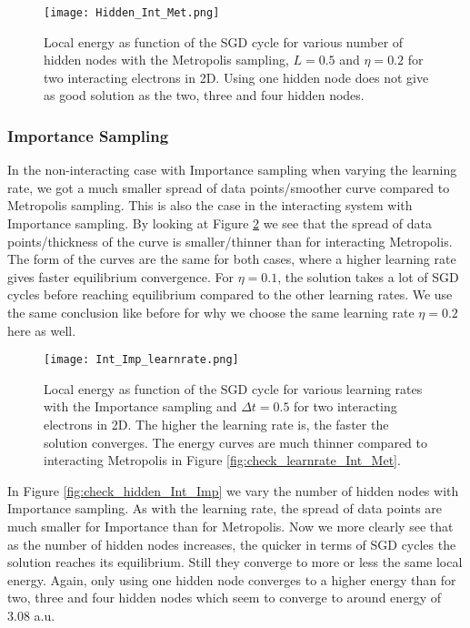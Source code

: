 \documentclass[12pt,a4paper,english]{article}
\begin{document}
\begin{figure}[t!]
	\centering\texttt{[image: Hidden\_Int\_Met.png]}
	\caption{Local energy as function of the SGD cycle for various number of hidden nodes with the Metropolis sampling, $L=0.5$ and $\eta=0.2$ for two interacting electrons in 2D. Using one hidden node does not give as good solution as the two, three and four hidden nodes. \label{fig:check_hidden_Int_Met}}
\end{figure} 

\newpage
\subsubsection{Importance Sampling}
\label{subsubsect:Results_int_Importance}
In the non-interacting case with Importance sampling when varying the learning rate, we got a much smaller spread of data points/smoother curve compared to Metropolis sampling. This is also the case in the interacting system with Importance sampling. By looking at Figure \ref{fig:check_learnrate_Int_Imp} we see that the spread of data points/thickness of the curve is smaller/thinner than for interacting Metropolis. The form of the curves are the same for both cases, where a higher learning rate gives faster equilibrium convergence. For $\eta=0.1$, the solution takes a lot of SGD cycles before reaching equilibrium compared to the other learning rates. We use the same conclusion like before for why we choose the same learning rate $\eta=0.2$ here as well.

\begin{figure}[t!]
	\centering\texttt{[image: Int\_Imp\_learnrate.png]}
	\caption{Local energy as function of the SGD cycle for various learning rates with the Importance sampling and $\Delta t=0.5$ for two interacting electrons in 2D. The higher the learning rate is, the faster the solution converges. The energy curves are much thinner compared to interacting Metropolis in Figure \ref{fig:check_learnrate_Int_Met}. \label{fig:check_learnrate_Int_Imp}}
\end{figure}

\newpage
In Figure \ref{fig:check_hidden_Int_Imp} we vary the number of hidden nodes with Importance sampling. As with the learning rate, the spread of data points are much smaller for Importance than for Metropolis. Now we more clearly see that as the number of hidden nodes increases, the quicker in terms of SGD cycles the solution reaches its equilibrium. Still they converge to more or less the same local energy. Again, only using one hidden node converges to a higher energy than for two, three and four hidden nodes which seem to converge to around energy of 3.08 a.u.
\end{document}
